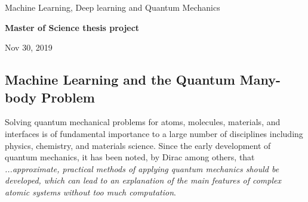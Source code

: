 \documentclass[%
oneside,                 %
final,                   %
10pt]{article}
\begin{document}

\newcommand{\exercisesection}[1]{\subsection*{#1}}






\thispagestyle{empty}

\begin{center}
{\LARGE\bf
\begin{spacing}{1.25}
Machine Learning, Deep learning and Quantum Mechanics
\end{spacing}
}
\end{center}


\begin{center}
{\bf Master of Science thesis project${}^{}$} \\ [0mm]
\end{center}

\begin{center}
\end{center}
    

\begin{center}
Nov 30, 2019
\end{center}

\vspace{1cm}


\subsection*{Machine Learning and the Quantum Many-body Problem}

Solving quantum mechanical problems for atoms,  molecules, materials, and
interfaces is of fundamental importance to a large number of
disciplines including physics, chemistry, and materials science. Since
the early development of quantum mechanics, it has been noted, by
Dirac among others, that \emph{...approximate, practical methods of applying quantum mechanics should be developed, which can lead to an explanation of the main features of complex atomic systems without too much computation}. 
\end{document}
